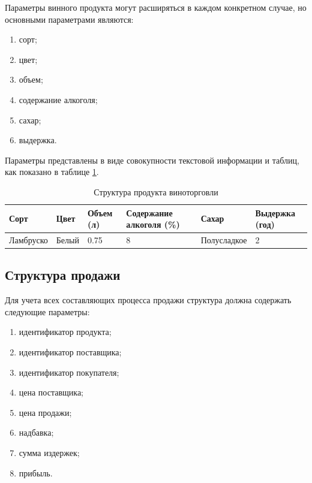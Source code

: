Параметры винного продукта могут расширяться в каждом конкретном случае, но основными параметрами являются:

\begin{enumerate}
	\item сорт;
	\item цвет;
	\item объем;
	\item содержание алкоголя;
	\item сахар;
	\item выдержка.
\end{enumerate}

Параметры представлены в виде совокупности текстовой информации и таблиц, как показано в таблице \ref{wine_structure}.

\begin{table}[h]
    \begin{center}
        \begin{threeparttable}
        \captionsetup{justification=raggedright,singlelinecheck=off}
    		\caption{Структура продукта виноторговли}
    		\label{wine_structure}
        \begin{tabular}{|l|l|l|p{30mm}|l|p{25mm}|}
            \hline
            Сорт & Цвет & Объем (л) & Содержание алкоголя (\%)  & Сахар & Выдержка (год) \\ \hline
            Ламбруско & Белый & 0.75 & 8 & Полусладкое & 2 \\ \hline
        \end{tabular}
    \end{threeparttable}
    \end{center}
\end{table}

\subsection{Структура продажи}

Для учета всех составляющих процесса продажи структура должна содержать следующие параметры:

\begin{enumerate}
	\item идентификатор продукта;
	\item идентификатор поставщика;
	\item идентификатор покупателя;
	\item цена поставщика;
	\item цена продажи;
	\item надбавка;
	\item сумма издержек;
	\item прибыль.
\end{enumerate}

